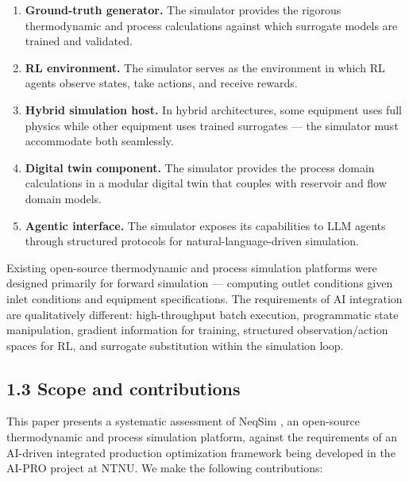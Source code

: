 \documentclass[review,3p]{custom}
\begin{document}
\begin{enumerate}
  \item \textbf{Ground-truth generator.} The simulator provides the rigorous thermodynamic and process calculations against which surrogate models are trained and validated.
  \item \textbf{RL environment.} The simulator serves as the environment in which RL agents observe states, take actions, and receive rewards.
  \item \textbf{Hybrid simulation host.} In hybrid architectures, some equipment uses full physics while other equipment uses trained surrogates --- the simulator must accommodate both seamlessly.
  \item \textbf{Digital twin component.} The simulator provides the process domain calculations in a modular digital twin that couples with reservoir and flow domain models.
  \item \textbf{Agentic interface.} The simulator exposes its capabilities to LLM agents through structured protocols for natural-language-driven simulation.
\end{enumerate}

Existing open-source thermodynamic and process simulation platforms were designed primarily for forward simulation --- computing outlet conditions given inlet conditions and equipment specifications. The requirements of AI integration are qualitatively different: high-throughput batch execution, programmatic state manipulation, gradient information for training, structured observation/action spaces for RL, and surrogate substitution within the simulation loop.

\subsection{1.3 Scope and contributions}

This paper presents a systematic assessment of NeqSim \cite{NeqSim2024}, an open-source thermodynamic and process simulation platform, against the requirements of an AI-driven integrated production optimization framework being developed in the AI-PRO project at NTNU. We make the following contributions:
\end{document}
